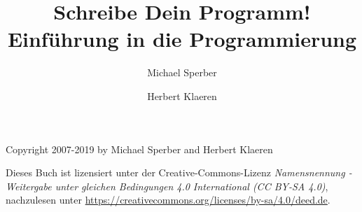 \documentclass{tup}
\theoremstyle{plain}
\theoremstyle{plain}
\theoremstyle{break}
\begin{document}
\setcounter{tocdepth}{1}
\begin{titlepage}
\title{Schreibe Dein Programm!\\{\large Einführung in die Programmierung}}
\author{Michael Sperber \and Herbert Klaeren}
\maketitle
Copyright \textcopyright{} 2007-2019 by Michael
  Sperber and Herbert Klaeren
  
  Dieses Buch ist lizensiert unter der Creative-Commons-Lizenz
  \textit{Namensnennung - Weitergabe unter gleichen Bedingungen 4.0 International (CC BY-SA 4.0)}, nachzulesen
  unter \url{https://creativecommons.org/licenses/by-sa/4.0/deed.de}.
\end{titlepage}

\thispagestyle{empty}

\tableofcontents

\setcounter{page}{1}








































\appendix



\nocite{Klaeren1983,HailperinKaiserKnight1999,FelleisenFindlerFlattKrishnamurthi2001,AbelsonSussmanSussman1996,Barendregt1990,KelseyClingerRees1998,Goos1996,Thiemann1994-gfp,Brooks1995,Meyer1997,HuthRyan2004,Hofstadter1979,Raymond1996,FriedmanWandHaynes2001,BauerWoessner1984,Hinze1991}




\printindex
\end{document}
